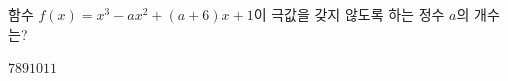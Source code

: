 함수 $f(x)=x^3-ax^2+(a+6)x+1$이 극값을 갖지 않도록 하는 정수 $a$의 개수는?
\begin{choices32}{$7$}{$8$}{$9$}{$10$}{$11$}\end{choices32}
